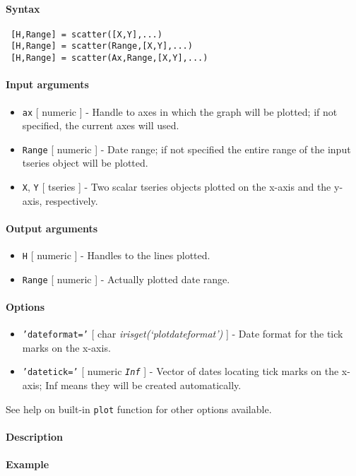 


	\paragraph{Syntax}
 
 \begin{verbatim}
 [H,Range] = scatter([X,Y],...)
 [H,Range] = scatter(Range,[X,Y],...)
 [H,Range] = scatter(Ax,Range,[X,Y],...)
 \end{verbatim}
 
 \paragraph{Input arguments}
 
 \begin{itemize}
 \item
   \texttt{ax} {[} numeric {]} - Handle to axes in which the graph will
   be plotted; if not specified, the current axes will used.
 \item
   \texttt{Range} {[} numeric {]} - Date range; if not specified the
   entire range of the input tseries object will be plotted.
 \item
   \texttt{X}, \texttt{Y} {[} tseries {]} - Two scalar tseries objects
   plotted on the x-axis and the y-axis, respectively.
 \end{itemize}
 
 \paragraph{Output arguments}
 
 \begin{itemize}
 \item
   \texttt{H} {[} numeric {]} - Handles to the lines plotted.
 \item
   \texttt{Range} {[} numeric {]} - Actually plotted date range.
 \end{itemize}
 
 \paragraph{Options}
 
 \begin{itemize}
 \item
   \texttt{'dateformat='} {[} char \textbar{}
   \emph{irisget(`plotdateformat')} {]} - Date format for the tick marks
   on the x-axis.
 \item
   \texttt{'datetick='} {[} numeric \textbar{} \emph{\texttt{Inf}} {]} -
   Vector of dates locating tick marks on the x-axis; Inf means they will
   be created automatically.
 \end{itemize}
 
 See help on built-in \texttt{plot} function for other options available.
 
 \paragraph{Description}
 
 \paragraph{Example}


